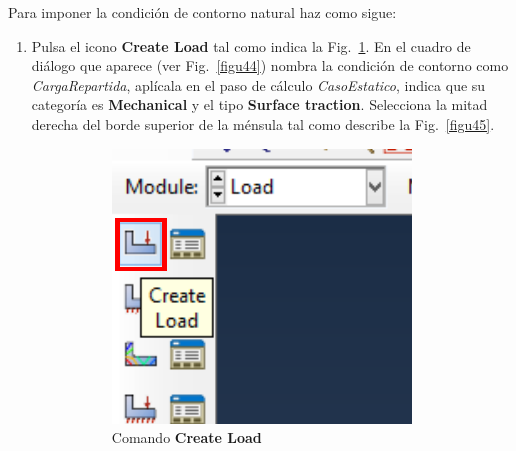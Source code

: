 Para imponer la condición de contorno natural haz como sigue:
\begin{enumerate}
\item Pulsa el icono \textbf{Create Load} tal como indica la
  Fig.~\ref{figu43}. En el cuadro de diálogo que aparece (ver
  Fig.~\ref{figu44}) nombra la condición de contorno como
  \textit{CargaRepartida}, aplícala en el paso de cálculo
  \textit{CasoEstatico}, indica que su categoría es
  \textbf{Mechanical} y el tipo \textbf{Surface traction}. Selecciona
  la mitad derecha del borde superior de la ménsula tal como
  describe la Fig.~\ref{figu45}.
  \begin{figure}[H]
    \centering
    \begin{subfigure}{0.23\textwidth}
      \includegraphics[width=\textwidth]{./body/images/imagen43.pdf}
      \caption{Comando \textbf{Create Load}}
      \label{figu43}
    \end{subfigure}%
    ~ %
    \begin{subfigure}{0.30\textwidth}

\end{subfigure}
\end{figure}
\end{enumerate}
